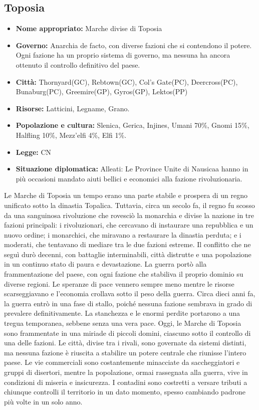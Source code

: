 \documentclass[10pt, a4paper]{report}
\begin{document}
\begin{multicols}{2}
\subsection*{Toposia}
\begin{itemize}
	\item \textbf{Nome appropriato:} Marche divise di Toposia
	\item \textbf{Governo:} Anarchia de facto, con diverse fazioni che si contendono il potere. Ogni fazione ha un proprio sistema di governo, ma nessuna ha ancora ottenuto il controllo definitivo del paese.
	\item \textbf{Città:} Thornyard(GC), Rebtown(GC), Col's Gate(PC), Deercross(PC), Bunaburg(PC), Greemire(GP), Gyros(GP), Lektos(PP)
	\item \textbf{Risorse:} Latticini, Legname, Grano.
	\item \textbf{Popolazione e cultura:} Slenica, Gerica, Injines, Umani 70\%, Gnomi 15\%, Halfling 10\%, Mezz'elfi 4\%, Elfi 1\%.
	\item \textbf{Legge:} CN
	\item \textbf{Situazione diplomatica:} Alleati: Le Province Unite di Nausicaa hanno in più occasioni mandato aiuti bellici e economici alla fazione rivoluzionaria.
\end{itemize}
Le Marche di Toposia un tempo erano una parte stabile e prospera di un regno unificato sotto la dinastia Topalica. Tuttavia, circa un secolo fa, il regno fu scosso da una sanguinosa rivoluzione che rovesciò la monarchia e divise la nazione in tre fazioni principali: i rivoluzionari, che cercavano di instaurare una repubblica e un nuovo ordine; i monarchici, che miravano a restaurare la dinastia perduta; e i moderati, che tentavano di mediare tra le due fazioni estreme. Il conflitto che ne seguì durò decenni, con battaglie interminabili, città distrutte e una popolazione in un continuo stato di paura e devastazione. La guerra portò alla frammentazione del paese, con ogni fazione che stabiliva il proprio dominio su diverse regioni. Le speranze di pace vennero sempre meno mentre le risorse scarseggiavano e l'economia crollava sotto il peso della guerra.
Circa dieci anni fa, la guerra entrò in una fase di stallo, poiché nessuna fazione sembrava in grado di prevalere definitivamente. La stanchezza e le enormi perdite portarono a una tregua temporanea, sebbene senza una vera pace. Oggi, le Marche di Toposia sono frammentate in una miriade di piccoli domini, ciascuno sotto il controllo di una delle fazioni. Le città, divise tra i rivali, sono governate da sistemi distinti, ma nessuna fazione è riuscita a stabilire un potere centrale che riunisse l’intero paese. Le vie commerciali sono costantemente minacciate da saccheggiatori e gruppi di disertori, mentre la popolazione, ormai rassegnata alla guerra, vive in condizioni di miseria e insicurezza. I contadini sono costretti a versare tributi a chiunque controlli il territorio in un dato momento, spesso cambiando padrone più volte in un solo anno. 

\end{multicols}
\end{document}
